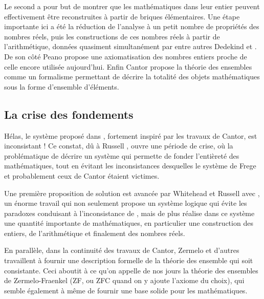 Le second a pour but de montrer que les mathématiques dans leur entier peuvent
effectivement être reconstruites à partir de briques élémentaires. Une étape
importante ici a été la réduction de l’analyse à un petit nombre de propriétés
des nombres réels, puis les constructions de ces nombres réels à partir
de l’arithmétique, données quasiment simultanément par entre autres Dedekind
 et .
De son côté Peano  propose
une axiomatisation des nombres entiers proche de celle encore utilisée aujourd’hui.
Enfin Cantor 
propose la théorie des ensembles comme un formalisme permettant
de décrire la totalité des objets mathématiques sous la forme d’ensemble
d’éléments.

\subsection{La crise des fondements}
Hélas, le système proposé dans , fortement inspiré par
les travaux de Cantor, est inconsistant !
Ce constat, dû à Russell ,
ouvre une période de crise, où la problématique de décrire un système qui permette
de fonder l’entièreté des mathématiques,
tout en évitant les inconsistances desquelles
le système de Frege et probablement ceux de Cantor étaient victimes.

Une première proposition de solution est avancée par Whitehead et Russell
avec , un énorme travail qui non seulement propose un système
logique qui évite les paradoxes conduisant à l’inconsistance de
, mais de plus réalise dans ce système une quantité importante
de mathématiques, en particulier une construction des entiers, de l’arithmétique et
finalement des nombres réels.

En parallèle, dans la continuité des travaux de Cantor,
Zermelo  et
d’autres travaillent à fournir une description formelle de la théorie des ensemble
qui soit consistante. Ceci aboutit à ce qu’on appelle de nos jours la
théorie des ensembles de Zermelo-Fraenkel (ZF, ou ZFC quand on y ajoute l’axiome
du choix), qui semble également à même de fournir une base solide pour les
mathématiques.

